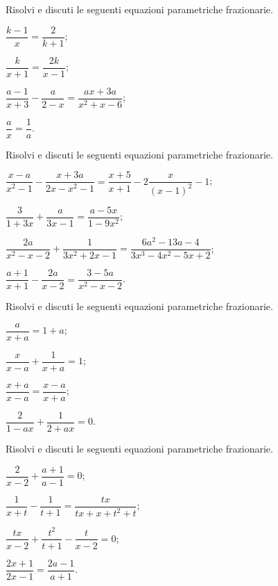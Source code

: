 \begin{esercizio}[\Ast]
\label{ese:17.53}
Risolvi e discuti le seguenti equazioni parametriche frazionarie.
\begin{multicols}{2}
\begin{enumeratea}
 \item $\dfrac{k-1}{x}=\dfrac{2}{k+1}$;
 \item $\dfrac{k}{x+1}=\dfrac{2k}{x-1}$;
 \item $\dfrac{a-1}{x+3}-\dfrac{a}{2-x}=\dfrac{ax+3a}{x^{2}+x-6}$;
 \item $\dfrac{a}{x}=\dfrac{1}{a}$.
\end{enumeratea}
\end{multicols}
\end{esercizio}

\begin{esercizio}[\Ast]
\label{ese:17.54}
Risolvi e discuti le seguenti equazioni parametriche frazionarie.
\begin{enumeratea}
 \item $\dfrac{x-a}{x^{2}-1}-\dfrac{x+3a}{2x-x^{2}-1}=\dfrac{x+5}{x+1}-2\dfrac{x}{(x-1)^{2}}-1$;
 \item $\dfrac{3}{1+3x}+\dfrac{a}{3x-1}=\dfrac{a-5x}{1-9x^{2}}$;
 \item $\dfrac{2a}{x^{2}-x-2}+\dfrac{1}{3x^{2}+2x-1}=\dfrac{6a^{2}-13a-4}{3x^{3}-4x^{2}-5x+2}$;
 \item $\dfrac{a+1}{x+1}-\dfrac{2a}{x-2}=\dfrac{3-5a}{x^{2}-x-2}$.
\end{enumeratea}
\end{esercizio}

\begin{esercizio}[\Ast]
\label{ese:17.55}
Risolvi e discuti le seguenti equazioni parametriche frazionarie.
\begin{multicols}{2}
\begin{enumeratea}
 \item $\dfrac{a}{x+a}=1+a$;
 \item $\dfrac{x}{x-a}+\dfrac{1}{x+a}=1$;
 \item $\dfrac{x+a}{x-a}=\dfrac{x-a}{x+a}$;
 \item $\dfrac{2}{1-ax}+\dfrac{1}{2+ax}=0$.
\end{enumeratea}
\end{multicols}
\end{esercizio}

\begin{esercizio}[\Ast]
\label{ese:17.56}
Risolvi e discuti le seguenti equazioni parametriche frazionarie.
\begin{multicols}{2}
\begin{enumeratea}
 \item $\dfrac{2}{x-2}+\dfrac{a+1}{a-1}=0$;
 \item $\dfrac{1}{x+t}-\dfrac{1}{t+1}=\dfrac{tx}{tx+x+t^{2}+t}$;
 \item $\dfrac{tx}{x-2}+\dfrac{t^{2}}{t+1}-\dfrac{t}{x-2}=0$;
 \item $\dfrac{2x+1}{2x-1}=\dfrac{2a-1}{a+1}$.
\end{enumeratea}
\end{multicols}
\end{esercizio}

